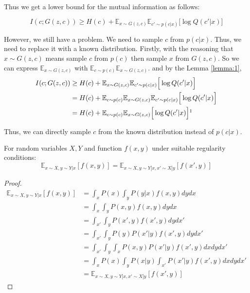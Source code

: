 Thus we get a lower bound for the mutual information as follows:

$$I(c;G(z,c)) \geq H(c) + \mathbb{E}_{x\sim G(z,c)}\mathbb{E}_{c'\sim p(c|x)}\Big[\log Q(c'|x)\Big]$$

However, we still have a problem. We need to sample $c$ from $p(c|x)$. Thus, we need to replace it with a known distribution. Firstly, with the reasoning that $x\sim G(z,c)$ means sample $c$ from $p(c)$ then sample $x$ from $G(z,c)$. So we can express $\mathbb{E}_{x\sim G(z,c)}$ with $\mathbb{E}_{c\sim p(c)}\mathbb{E}_{x\sim G(z,c)}$. and by the Lemma \ref{lemma:1}, 
\begin{align*}
I(c;G(z,c)) &\geq H(c) + \mathbb{E}_{x\sim G(z,c)}\mathbb{E}_{c'\sim p(c|x)}\Big[\log Q(c'|x)\Big]\\
&= H(c) + \mathbb{E}_{c\sim p(c)}\mathbb{E}_{x\sim G(z,c)}\mathbb{E}_{c'\sim p(c|x)}\Big[\log Q(c'|x)\Big]\\
& = H(c) + \mathbb{E}_{c\sim p(c)}\mathbb{E}_{x\sim G(z,c)}\Big[\log Q(c'|x)\Big] \footnotemark
\end{align*}

Thus, we can directly sample $c$ from the known distribution instead of $p(c|x)$.

\begin{lemma}
	For random variables $X, Y$ and function $f(x, y)$ under suitable regularity conditions:
	$$\mathbb{E}_{x\sim X, y\sim Y|x}[f(x,y)] = \mathbb{E}_{x\sim X, y\sim Y|x, x'\sim X|y}[f(x',y)]$$
	\begin{proof}
		\begin{align*}
		\mathbb{E}_{x\sim X, y\sim Y|x}[f(x,y)] &=\int_x P(x)\int_y P(y|x)f(x,y)dydx\\
		& = \int_x\int_yP(x,y)f(x,y)dydx\\
		& = \int_{x'}\int_yP(x',y)f(x',y)dydx'\\
		& = \int_{x'}\int_y P(y)P(x'|y)f(x',y)dydx'\\
		& = \int_{x'}\int_y\int_{x} P(x,y)P(x'|y)f(x',y)dxdydx'\\
		& = \int_{x}P(x)\int_y P(x|y) \int_{x'} P(x'|y)f(x',y)dxdydx'\\
		& = \mathbb{E}_{x\sim X, y\sim Y|x, x'\sim X|y}[f(x',y)]
		\end{align*}
	\end{proof}
	\label{lemma:1}
\end{lemma} 
